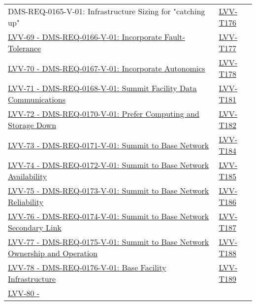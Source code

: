\begin{longtable}[]{p{13cm}p{3cm}}
{DMS-REQ-0165-V-01: Infrastructure Sizing for "catching up"} &
\protect\hyperlink{lvv-t176---verify-implementation-of-infrastructure-sizing-for-catching-up-dms-req-0165}{LVV-T176}\tabularnewline
\href{https://jira.lsstcorp.org/browse/LVV-69}{LVV-69 -
DMS-REQ-0166-V-01: Incorporate Fault-Tolerance} &
\protect\hyperlink{lvv-t177---verify-implementation-of-incorporate-fault-tolerance-dms-req-0166}{LVV-T177}\tabularnewline
\href{https://jira.lsstcorp.org/browse/LVV-70}{LVV-70 -
DMS-REQ-0167-V-01: Incorporate Autonomics} &
\protect\hyperlink{lvv-t178---verify-implementation-of-incorporate-autonomics-dms-req-0167}{LVV-T178}\tabularnewline
\href{https://jira.lsstcorp.org/browse/LVV-71}{LVV-71 -
DMS-REQ-0168-V-01: Summit Facility Data Communications} &
\protect\hyperlink{lvv-t181---verify-implementation-of-summit-facility-data-communications-dms-req-0168}{LVV-T181}\tabularnewline
\href{https://jira.lsstcorp.org/browse/LVV-72}{LVV-72 -
DMS-REQ-0170-V-01: Prefer Computing and Storage Down} &
\protect\hyperlink{lvv-t182---verify-implementation-of-prefer-computing-and-storage-down-dms-req-0170}{LVV-T182}\tabularnewline
\href{https://jira.lsstcorp.org/browse/LVV-73}{LVV-73 -
DMS-REQ-0171-V-01: Summit to Base Network} &
\protect\hyperlink{lvv-t184---verify-implementation-of-summit-to-base-network-dms-req-0171}{LVV-T184}\tabularnewline
\href{https://jira.lsstcorp.org/browse/LVV-74}{LVV-74 -
DMS-REQ-0172-V-01: Summit to Base Network Availability} &
\protect\hyperlink{lvv-t185---verify-implementation-of-summit-to-base-network-availability-dms-req-0172}{LVV-T185}\tabularnewline
\href{https://jira.lsstcorp.org/browse/LVV-75}{LVV-75 -
DMS-REQ-0173-V-01: Summit to Base Network Reliability} &
\protect\hyperlink{lvv-t186---verify-implementation-of-summit-to-base-network-reliability-dms-req-0173}{LVV-T186}\tabularnewline
\href{https://jira.lsstcorp.org/browse/LVV-76}{LVV-76 -
DMS-REQ-0174-V-01: Summit to Base Network Secondary Link} &
\protect\hyperlink{lvv-t187---verify-implementation-of-summit-to-base-network-secondary-link-dms-req-0174}{LVV-T187}\tabularnewline
\href{https://jira.lsstcorp.org/browse/LVV-77}{LVV-77 -
DMS-REQ-0175-V-01: Summit to Base Network Ownership and Operation} &
\protect\hyperlink{lvv-t188---verify-implementation-of-summit-to-base-network-ownership-and-operation-dms-req-0175}{LVV-T188}\tabularnewline
\href{https://jira.lsstcorp.org/browse/LVV-78}{LVV-78 -
DMS-REQ-0176-V-01: Base Facility Infrastructure} &
\protect\hyperlink{lvv-t189---verify-implementation-of-base-facility-infrastructure-dms-req-0176}{LVV-T189}\tabularnewline
\href{https://jira.lsstcorp.org/browse/LVV-80}{LVV-80 -
}
\end{longtable}
